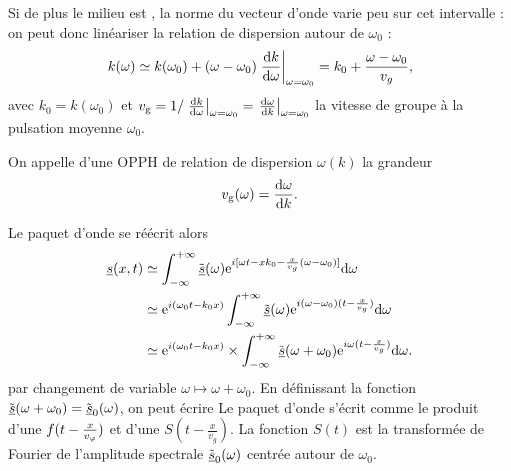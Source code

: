 \documentclass[12pt,fancy]{cours}%
\begin{document}
Si de plus le milieu  est , la norme du vecteur d'onde varie peu sur cet intervalle : on peut donc linéariser la relation de dispersion autour de $\omega_0$ :
  \begin{equation}
   k(\omega)\simeq k(\omega_0)+(\omega-\omega_0)\left.\frac{\mathrm{d} k}{\mathrm{d}\omega}\right|_{\omega=\omega_0} = k_0 + \frac{\omega-\omega_0}{v_g},
   \end{equation}
   avec $k_0=k(\omega_0)$ et  $v_{\rm{g}}=1/\left.\frac{\mathrm{d} k}{\mathrm{d}\omega}\right|_{\omega=\omega_0}=\left.\frac{\mathrm{d} \omega}{\mathrm{d} k}\right|_{\omega=\omega_0}$ la vitesse de groupe à la pulsation moyenne $\omega_0$.
   \begin{definition}\label{def:}
    On appelle  d'une OPPH de relation de dispersion $\omega(k)$ la grandeur
    \begin{equation*}
    \label{eq:def_vg}
    v_{\rm{g}}(\omega) = \frac{\mathrm{d} \omega}{\mathrm{d} k}.
  \end{equation*}
  \end{definition}
Le paquet d'onde se réécrit alors
\begin{align}
\underline{s}(x,t)
& \simeq
\int_{ - \infty}^{ +\infty}
\tilde{\underline{s}}(\omega)
\mathrm{e}^{i[\omega t- x k_0 - \frac{x}{v_g}(\omega-\omega_0)]}\mathrm{d} \omega \\
& \simeq \mathrm{e}^{i(\omega_0 t-k_0 x)}\int_{ - \infty}^{ +\infty}\tilde{\underline{s}}(\omega)\mathrm{e}^{i(\omega-\omega_0)(t-\frac{x}{v_g})}\mathrm{d}\omega \\
& \simeq \mathrm{e}^{i(\omega_0 t-k_0 x)}\times\int_{ - \infty}^{ +\infty}\tilde{\underline{s}}(\omega + \omega_0)\mathrm{e}^{i\omega(t-\frac{x}{v_g})}\mathrm{d}\omega.
\end{align}
par changement de variable $\omega \mapsto \omega + \omega_0$. En définissant la fonction $\tilde{\underline{s}}(\omega + \omega_0) = \tilde{\underline{s}}_0(\omega)$, on peut écrire
Le paquet d'onde s'écrit comme le produit d'une  $f(t-\frac{x}{v_{\varphi}})$ et d'une  $S(t -\frac{x}{v_g })$. La fonction $S(t)$ est la transformée de Fourier de l'amplitude spectrale  $\tilde{\underline{s}}_0(\omega)$ centrée autour de  $\omega_0$.
\end{document}
